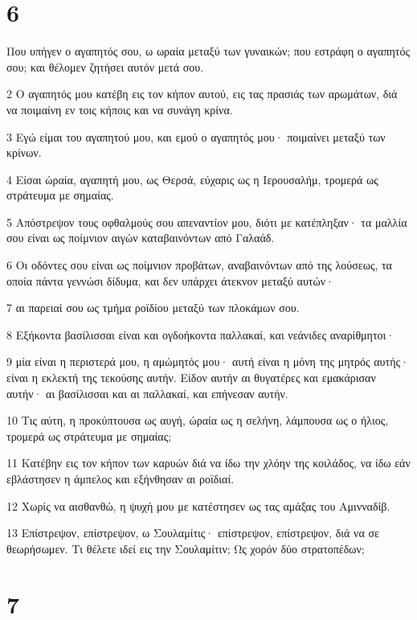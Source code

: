 \chapter{6}

\par Που υπήγεν ο αγαπητός σου, ω ωραία μεταξύ των γυναικών; που εστράφη ο αγαπητός σου; και θέλομεν ζητήσει αυτόν μετά σου.
\par 2 Ο αγαπητός μου κατέβη εις τον κήπον αυτού, εις τας πρασιάς των αρωμάτων, διά να ποιμαίνη εν τοις κήποις και να συνάγη κρίνα.
\par 3 Εγώ είμαι του αγαπητού μου, και εμού ο αγαπητός μου· ποιμαίνει μεταξύ των κρίνων.
\par 4 Είσαι ώραία, αγαπητή μου, ως Θερσά, εύχαρις ως η Ιερουσαλήμ, τρομερά ως στράτευμα με σημαίας.
\par 5 Απόστρεψον τους οφθαλμούς σου απεναντίον μου, διότι με κατέπληξαν· τα μαλλία σου είναι ως ποίμνιον αιγών καταβαινόντων από Γαλαάδ.
\par 6 Οι οδόντες σου είναι ως ποίμνιον προβάτων, αναβαινόντων από της λούσεως, τα οποία πάντα γεννώσι δίδυμα, και δεν υπάρχει άτεκνον μεταξύ αυτών·
\par 7 αι παρειαί σου ως τμήμα ροϊδίου μεταξύ των πλοκάμων σου.
\par 8 Εξήκοντα βασίλισσαι είναι και ογδοήκοντα παλλακαί, και νεάνιδες αναρίθμητοι·
\par 9 μία είναι η περιστερά μου, η αμώμητός μου· αυτή είναι η μόνη της μητρός αυτής· είναι η εκλεκτή της τεκούσης αυτήν. Είδον αυτήν αι θυγατέρες και εμακάρισαν αυτήν· αι βασίλισσαι και αι παλλακαί, και επήνεσαν αυτήν.
\par 10 Τις αύτη, η προκύπτουσα ως αυγή, ώραία ως η σελήνη, λάμπουσα ως ο ήλιος, τρομερά ως στράτευμα με σημαίας;
\par 11 Κατέβην εις τον κήπον των καρυών διά να ίδω την χλόην της κοιλάδος, να ίδω εάν εβλάστησεν η άμπελος και εξήνθησαν αι ροϊδιαί.
\par 12 Χωρίς να αισθανθώ, η ψυχή μου με κατέστησεν ως τας αμάξας του Αμινναδίβ.
\par 13 Επίστρεψον, επίστρεψον, ω Σουλαμίτις· επίστρεψον, επίστρεψον, διά να σε θεωρήσωμεν. Τι θέλετε ιδεί εις την Σουλαμίτιν; Ως χορόν δύο στρατοπέδων;

\chapter{7}

